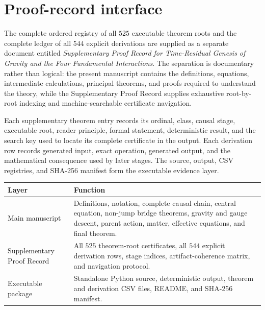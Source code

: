 \documentclass[11pt]{article}
\numberwithin{equation}{section}
\theoremstyle{remark}
\begin{document}
\clearpage
\section{Proof-record interface}
\label{app:proofrecord}
The complete ordered registry of all $525$ executable theorem roots and the complete ledger of all $544$ explicit derivations are supplied as a separate document entitled \emph{Supplementary Proof Record for Time-Residual Genesis of Gravity and the Four Fundamental Interactions}. The separation is documentary rather than logical: the present manuscript contains the definitions, equations, intermediate calculations, principal theorems, and proofs required to understand the theory, while the Supplementary Proof Record supplies exhaustive root-by-root indexing and machine-searchable certificate navigation.

Each supplementary theorem entry records its ordinal, class, causal stage, executable root, reader principle, formal statement, deterministic result, and the search key used to locate its complete certificate in the output. Each derivation row records generated input, exact operation, generated output, and the mathematical consequence used by later stages. The source, output, CSV registries, and SHA-256 manifest form the executable evidence layer.

\begin{center}
\begin{tabular}{p{4.2cm}p{10.0cm}}
\toprule Layer&Function\\\midrule
Main manuscript&Definitions, notation, complete causal chain, central equation, non-jump bridge theorems, gravity and gauge descent, parent action, matter, effective equations, and final theorem.\\
Supplementary Proof Record&All $525$ theorem-root certificates, all $544$ explicit derivation rows, stage indices, artifact-coherence matrix, and navigation protocol.\\
Executable package&Standalone Python source, deterministic output, theorem and derivation CSV files, README, and SHA-256 manifest.\\
\bottomrule
\end{tabular}
\end{center}
\end{document}
